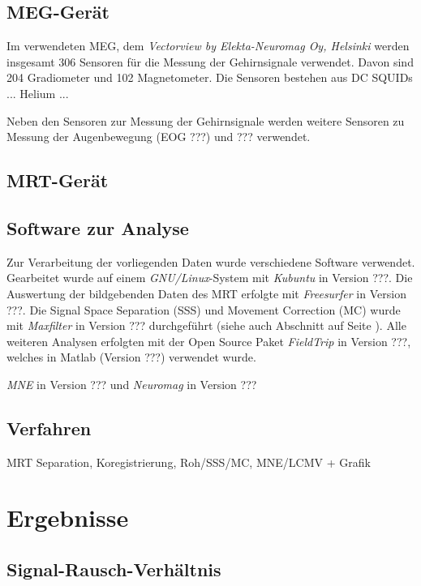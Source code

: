 \documentclass[doc,a4paper,12pt]{apa6}
\makeatletter
\DeclareRobustCommand*{\nameref}[1]{%
      \glqq{\myorg@nameref{#1}}\grqq%
    }%
\makeatother
\begin{document}
\subsection{MEG-Gerät}

Im verwendeten MEG, dem \emph{Vectorview by Elekta-Neuromag Oy, Helsinki} werden insgesamt 306 Sensoren für die Messung der Gehirnsignale verwendet. Davon sind 204 Gradiometer und 102 Magnetometer. Die Sensoren bestehen aus DC SQUIDs ... Helium ...

Neben den Sensoren zur Messung der Gehirnsignale werden weitere Sensoren zu Messung der Augenbewegung (EOG ???) und ??? verwendet.

\subsection{MRT-Gerät}



\subsection{Software zur Analyse}
\label{sec:software}

Zur Verarbeitung der vorliegenden Daten wurde verschiedene Software verwendet. Gearbeitet wurde auf einem \emph{GNU/Linux}-System mit \emph{Kubuntu} in Version ???. Die Auswertung der bildgebenden Daten des MRT erfolgte mit \emph{Freesurfer} in Version ???. Die Signal Space Separation (SSS) und Movement Correction (MC) wurde mit \emph{Maxfilter} in Version ??? durchgeführt (siehe auch Abschnitt \nameref{sec:maxfilter} auf Seite \pageref{sec:maxfilter}). Alle weiteren Analysen erfolgten mit der Open Source Paket \emph{FieldTrip} in Version ???, welches in Matlab (Version ???) verwendet wurde.

\emph{MNE} in Version ??? und \emph{Neuromag} in Version ??? 

\subsection{Verfahren}

MRT Separation, Koregistrierung, Roh/SSS/MC, MNE/LCMV + Grafik

\section{Ergebnisse}

\subsection{Signal-Rausch-Verhältnis}
\label{sec:snr}
\end{document}

